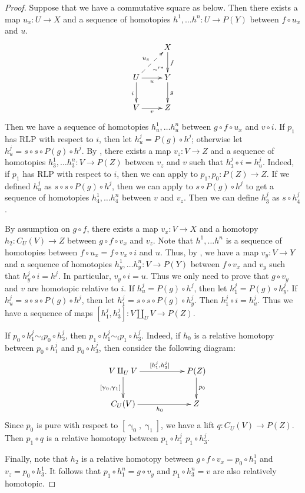 \documentclass{tac}
\theoremstyle{definition}
\newcommand{\cyli}{\upgamma}
\begin{document}
\begin{proof}
Suppose that we have a commutative square as below.
Then there exists a map $u_x : U \to X$ and a sequence of homotopies $h^1, \ldots h^n : U \to P(Y)$ between $f \circ u_x$ and $u$.
\[ \xymatrix{   \ar@{}[dr]|(.7){\sim^{r*}}            & X \ar[d]^f \\
              U \ar@{-->}[ur]^{u_x} \ar[d]_i \ar[r]_u & Y \ar[d]^g \\
              V \ar[r]_v                              & Z
            } \]
Then we have a sequence of homotopies $h^1_u, \ldots h^n_u$ between $g \circ f \circ u_x$ and $v \circ i$.
If $p_1$ has RLP with respect to $i$, then let $h^j_u = P(g) \circ h^j$; otherwise let $h^j_u = s \circ s \circ P(g) \circ h^j$.
By , there exists a map $v_z : V \to Z$ and a sequence of homotopies $h^1_3, \ldots h^n_3 : V \to P(Z)$ between $v_z$ and $v$ such that $h^j_3 \circ i = h^j_u$.
Indeed, if $p_1$ has RLP with respect to $i$, then we can apply  to $p_1,p_0 : P(Z) \to Z$.
If we defined $h^j_u$ as $s \circ s \circ P(g) \circ h^j$, then we can apply  to $s \circ P(g) \circ h^j$ to get a sequence of homotopies $h^1_4, \ldots h^n_4$ between $v$ and $v_z$.
Then we can define $h^j_3$ as $s \circ h^j_4$.

By assumption on $g \circ f$, there exists a map $v_x : V \to X$ and a homotopy $h_2 : C_U(V) \to Z$ between $g \circ f \circ v_x$ and $v_z$.
Note that $h^1, \ldots h^n$ is a sequence of homotopies between $f \circ u_x = f \circ v_x \circ i$ and $u$.
Thus, by , we have a map $v_y : V \to Y$ and a sequence of homotopies $h^1_y, \ldots h^n_y : V \to P(Y)$ between $f \circ v_x$ and $v_y$ such that $h^j_y \circ i = h^j$.
In particular, $v_y \circ i = u$.
Thus we only need to prove that $g \circ v_y$ and $v$ are homotopic relative to $i$.
If $h^j_u = P(g) \circ h^j$, then let $h^j_1 = P(g) \circ h^j_y$.
If $h^j_u = s \circ s \circ P(g) \circ h^j$, then let $h^j_1 = s \circ s \circ P(g) \circ h^j_y$.
Then $h^j_1 \circ i = h^j_u$.
Thus we have a sequence of maps $[h^j_1,h^j_3] : V \amalg_U V \to P(Z)$.

If $p_0 \circ h^j_1 \sim_i p_0 \circ h^j_3$, then $p_1 \circ h^j_1 \sim_i p_1 \circ h^j_3$.
Indeed, if $h_0$ is a relative homotopy between $p_0 \circ h^j_1$ and $p_0 \circ h^j_3$, then consider the following diagram:
\[ \xymatrix{ V \amalg_U V \ar[rr]^{[h^j_1, h^j_3]} \ar[d]_{[\cyli_0,\cyli_1]} & & P(Z) \ar[d]^{p_0} \\
              C_U(V) \ar[rr]_{h_0} & & Z
            } \]
Since $p_0$ is pure with respect to $[\cyli_0,\cyli_1]$, we have a lift $q : C_U(V) \to P(Z)$.
Then $p_1 \circ q$ is a relative homotopy between $p_1 \circ h^j_1$ $p_1 \circ h^j_3$.

Finally, note that $h_2$ is a relative homotopy between $g \circ f \circ v_x = p_0 \circ h^1_1$ and $v_z = p_0 \circ h^1_3$.
It follows that $p_1 \circ h^n_1 = g \circ v_y$ and $p_1 \circ h^n_3 = v$ are also relatively homotopic.
\end{proof}
\end{document}
